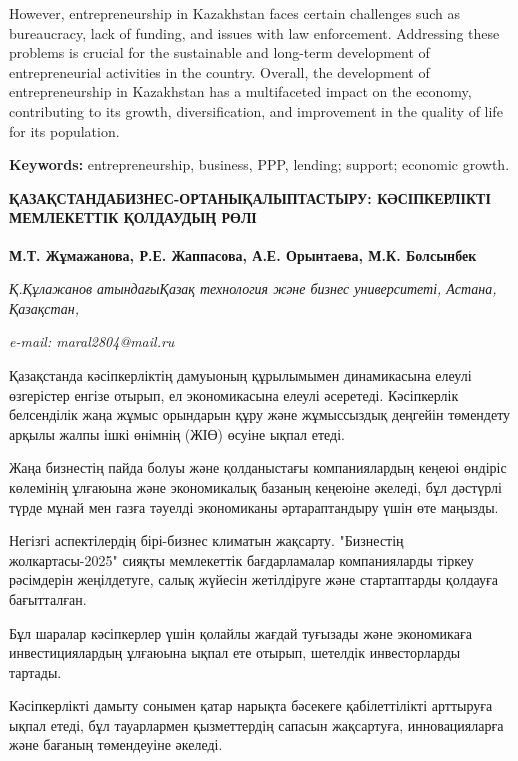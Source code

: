 However, entrepreneurship in Kazakhstan faces certain challenges such as
bureaucracy, lack of funding, and issues with law enforcement.
Addressing these problems is crucial for the sustainable and long-term
development of entrepreneurial activities in the country. Overall, the
development of entrepreneurship in Kazakhstan has a multifaceted impact
on the economy, contributing to its growth, diversification, and
improvement in the quality of life for its population.

{\bfseries Keywords:} entrepreneurship, business, PPP, lending; support;
economic growth.

\begin{articleheader}
{\bfseries ҚАЗАҚСТАНДАБИЗНЕС-ОРТАНЫҚАЛЫПТАСТЫРУ: КӘСІПКЕРЛІКТІ МЕМЛЕКЕТТІК ҚОЛДАУДЫҢ РӨЛІ}

{\bfseries
М.Т. Жұмажанова\textsuperscript{\envelope },
Р.Е. Жаппасова,
А.Е. Орынтаева,
М.К. Болсынбек}
\end{articleheader}

\begin{affiliation}
\emph{Қ.Құлажанов атындағыҚазақ технология және бизнес университеті, Астана, Қазақстан,}

\emph{e-mail: maral2804@mail.ru}
\end{affiliation}

Қазақстанда кәсіпкерліктің дамуыоның құрылымымен динамикасына елеулі
өзгерістер енгізе отырып, ел экономикасына елеулі әсеретеді. Кәсіпкерлік
белсенділік жаңа жұмыс орындарын құру және жұмыссыздық деңгейін
төмендету арқылы жалпы ішкі өнімнің (ЖІӨ) өсуіне ықпал етеді.

Жаңа бизнестің пайда болуы және қолданыстағы компаниялардың кеңеюі
өндіріс көлемінің ұлғаюына және экономикалық базаның кеңеюіне әкеледі,
бұл дәстүрлі түрде мұнай мен газға тәуелді экономиканы әртараптандыру
үшін өте маңызды.

Негізгі аспектілердің бірі-бизнес климатын жақсарту. "Бизнестің
жолкартасы-2025" сияқты мемлекеттік бағдарламалар компанияларды тіркеу
рәсімдерін жеңілдетуге, салық жүйесін жетілдіруге және стартаптарды
қолдауға бағытталған.

Бұл шаралар кәсіпкерлер үшін қолайлы жағдай туғызады және экономикаға
инвестициялардың ұлғаюына ықпал ете отырып, шетелдік инвесторларды
тартады.

Кәсіпкерлікті дамыту сонымен қатар нарықта бәсекеге қабілеттілікті
арттыруға ықпал етеді, бұл тауарлармен қызметтердің сапасын жақсартуға,
инновацияларға және бағаның төмендеуіне әкеледі.

